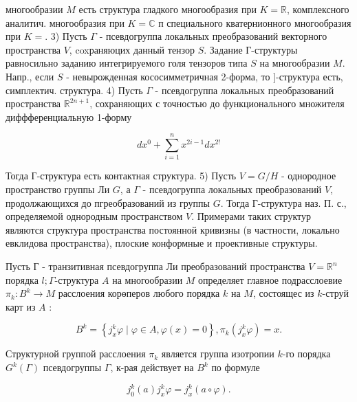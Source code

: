 \documentclass[10pt]{article}
\begin{document}
многообразии $M$ есть структура гладкого многообразия при $K=\mathbb{R}$, комплексного аналитич. многообразия при $K=\mathbb{C}$ п специального кватернионного многообразия при $K=$. 3) Пусть $\Gamma$ - псевдогруппа локальных преобразований векторного пространства $V$, coxраняюцих данный тензор $S$. Задание Г-структуры равносильно заданию интегрируемого голя тензоров типа $S$ на многообразии $M$. Напр., если $S$ - невырожденная кососимметричная 2-форма, то ]-структура есть, симплектич. структура. 4) Пусть $\Gamma$ - псевдогруппа локальных преобразований пространства $\mathbb{R}^{2 n+1}$, сохраняющих с точностью до функционального множителя диффференциальную 1-форму



\[

d x^{0}+\sum_{i=1}^{n} x^{2 i-1} d x^{2 !}

\]



Тогда Г-структура есть контактная структура. 5) Пусть $V=G / H$ - однородное пространство группы Ли $G$, а $\Gamma$ - псевдогруппа локальных преобразований $V$, продолжающихся до пгреобразований из группы $G$. Тогда Г-структура наз. П. с., определяемой однородным пространством $V$. Примерами таких структур являются структура пространства постоянной кривизны (в частности, локально евклидова пространства), плоские конформные и проективные структуры.



Пусть Г - транзитивная псевдогруппа Ли преобразований пространства $V=\mathbb{R}^{n}$ порядка $l ; \Gamma$-структура $A$ на многообразии $M$ определяет главное подрасслоевие $\pi_{k}: B^{k} \rightarrow M$ расслоения корөперов любого порядка $k$ на $M$, состоящес из $k$-струй карт из $A$ :



\[

B^{k}=\left\{j_{x}^{k} \varphi \mid \varphi \in A, \varphi(x)=0\right\}, \pi_{k}\left(j_{x}^{k} \varphi\right)=x .

\]



Структурной группой расслоения $\pi_{k}$ является группа изотропии $k$-го порядка $G^{k}(\Gamma)$ псевдогруппы $\Gamma$, к-рая действует на $B^{k}$ по формуле



\[

j_{0}^{k}(a) j_{x}^{k} \varphi=j_{x}^{k}(a \circ \varphi) .

\]
\end{document}
